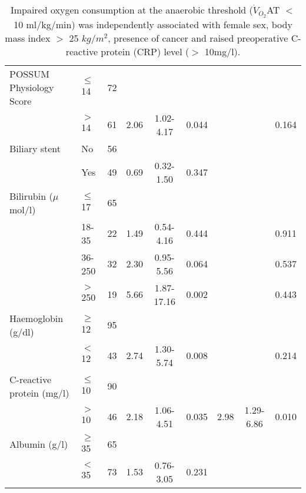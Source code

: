 \begin{sidewaystable}[p]
\begin{tabular}{|l l c| c c c| c c c|}
		POSSUM Physiology Score    & $\leq$ 14 & 72  &      &            &            &      &            &  \\
		                           & $>$ 14    & 61  & 2.06 & 1.02-4.17  & 0.044      &      &            & 0.164      \\
		Biliary stent              & No        & 56  &      &            &            &      &            &  \\
		                           & Yes       & 49  & 0.69 & 0.32-1.50  & 0.347      &      &            &  \\
		Bilirubin ($\mu$mol/l)     & $\leq$ 17 & 65  &      &            &            &      &            &  \\
		                           & 18-35     & 22  & 1.49 & 0.54-4.16  & 0.444      &      &            & 0.911      \\
		                           & 36-250    & 32  & 2.30 & 0.95-5.56  & 0.064      &      &            & 0.537      \\
		                           & $>$ 250   & 19  & 5.66 & 1.87-17.16 & 0.002      &      &            & 0.443      \\
		Haemoglobin (g/dl)         & $\geq$ 12 & 95  &      &            &            &      &            &  \\
		                           & $<$ 12    & 43  & 2.74 & 1.30-5.74  & 0.008      &      &            & 0.214      \\
		C-reactive protein (mg/l)  & $\leq$ 10 & 90  &      &            &            &      &            &  \\
		                           & $>$ 10    & 46  & 2.18 & 1.06-4.51  & 0.035      & 2.98 & 1.29-6.86  & 0.010      \\
		Albumin (g/l)              & $\geq$ 35 & 65  &      &            &            &      &            &  \\
		                           & $<$ 35    & 73  & 1.53 & 0.76-3.05  & 0.231      &      &            &  \\ \hline
	\end{tabular}
	\medskip
	\caption*{Impaired oxygen consumption at the anaerobic threshold ($\dot{V}_{O_2}$AT $<$ 10 ml/kg/min) was independently associated with female sex, body mass index $>$ 25 $kg/m^2$, presence of cancer and raised preoperative C-reactive protein (CRP) level ($>$ 10mg/l).}
\end{sidewaystable}
